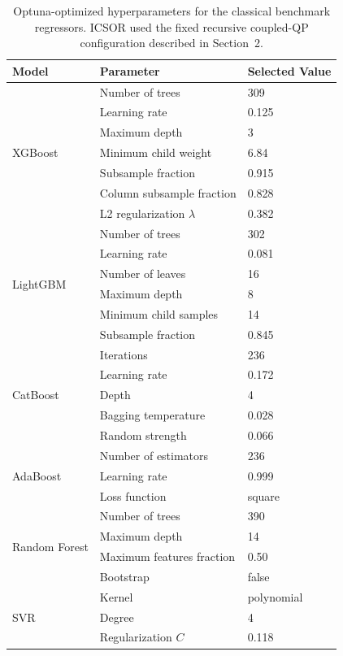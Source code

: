 \documentclass[11pt]{article}
\begin{document}
\begin{table}[htbp]
\centering
\caption{Optuna-optimized hyperparameters for the classical benchmark regressors. ICSOR used the fixed recursive coupled-QP configuration described in Section~2.}
\label{tab:optuna_hyperparameters}
\small
\begin{tabular}{@{}lll@{}}
\toprule
\textbf{Model} & \textbf{Parameter} & \textbf{Selected Value} \\
\midrule
\multirow{7}{*}{XGBoost}
 & Number of trees & 309 \\
 & Learning rate & 0.125 \\
 & Maximum depth & 3 \\
 & Minimum child weight & 6.84 \\
 & Subsample fraction & 0.915 \\
 & Column subsample fraction & 0.828 \\
 & L2 regularization $\lambda$ & 0.382 \\
\midrule
\multirow{6}{*}{LightGBM}
 & Number of trees & 302 \\
 & Learning rate & 0.081 \\
 & Number of leaves & 16 \\
 & Maximum depth & 8 \\
 & Minimum child samples & 14 \\
 & Subsample fraction & 0.845 \\
\midrule
\multirow{5}{*}{CatBoost}
 & Iterations & 236 \\
 & Learning rate & 0.172 \\
 & Depth & 4 \\
 & Bagging temperature & 0.028 \\
 & Random strength & 0.066 \\
\midrule
\multirow{3}{*}{AdaBoost}
 & Number of estimators & 236 \\
 & Learning rate & 0.999 \\
 & Loss function & square \\
\midrule
\multirow{4}{*}{Random Forest}
 & Number of trees & 390 \\
 & Maximum depth & 14 \\
 & Maximum features fraction & 0.50 \\
 & Bootstrap & false \\
\midrule
\multirow{4}{*}{SVR}
 & Kernel & polynomial \\
 & Degree & 4 \\
 & Regularization $C$ & 0.118 \\

\end{tabular}
\end{table}
\end{document}
